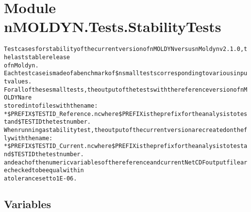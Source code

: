 %
%
%


\section{Module nMOLDYN.Tests.StabilityTests}

    \label{nMOLDYN:Tests:StabilityTests}
\begin{alltt}

Test cases for stability of the current version of nMOLDYN versus nMoldyn v2.1.0, the last stable release 
of nMoldyn.
Each test case is made of a benchmark of \$n small tests corresponding to various input values. 
For all of these small tests, the output of the tests with the reference version of nMOLDYN are 
stored into files with the name:
    * \$PREFIX\$TESTID\_Reference.nc where \$PREFIX is the prefix for the analysis to test and \$TESTID the test number.
      When running a stability test, the output of the current version are created on the fly with the name:
    * \$PREFIX\$TESTID\_Current.nc where \$PREFIX is the prefix for the analysis to test and \$TESTID the test number.
      and each of the numeric variables of the reference and current NetCDF output file are checked to be equal within 
      a tolerance set to 1E-06.
\end{alltt}



  \subsection{Variables}

